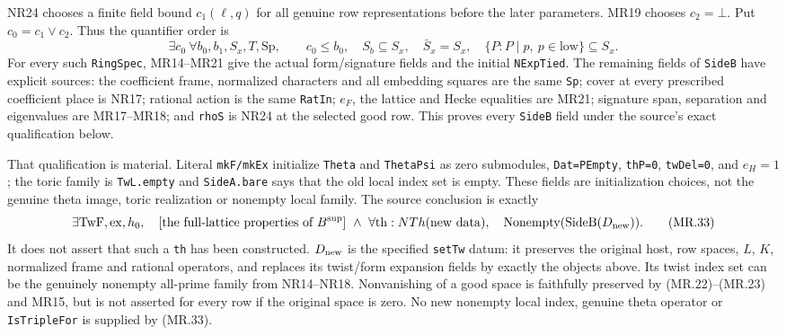 NR24 chooses a finite field bound $c_1(\ell,q)$ for all genuine
row representations before the later parameters. MR19 chooses
$c_2=\bot$. Put $c_0=c_1\vee c_2$. Thus the quantifier order is
\[
 \exists c_0\ \forall b_0,b_1,S_x,T,\mathrm{Sp},\qquad
 c_0\le b_0,\quad S_b\subseteq S_x,\quad
 \bar S_x=S_x,\quad
 \{P:P\mid p,\ p\in\mathrm{low}\}\subseteq S_x.    \tag{MR.32}
\]
For every such \texttt{RingSpec}, MR14--MR21 give the actual
form/signature fields and the initial \texttt{NExpTied}. The
remaining fields of \texttt{SideB} have explicit sources:
the coefficient frame, normalized characters and all embedding
squares are the same \texttt{Sp}; cover at every prescribed
coefficient place is NR17; rational action is the same
\texttt{RatIn}; $e_F$, the lattice and Hecke equalities are MR21;
signature span, separation and eigenvalues are MR17--MR18; and
\texttt{rhoS} is NR24 at the selected good row. This proves every
\texttt{SideB} field under the source's exact qualification below.

That qualification is material. Literal \texttt{mkF/mkEx} initialize
\texttt{Theta} and \texttt{ThetaPsi} as zero submodules,
\texttt{Dat=PEmpty}, \texttt{thP=0}, \texttt{twDel=0}, and
$e_H=1$; the toric family is \texttt{TwL.empty} and
\texttt{SideA.bare} says that the old local index set is empty.
These fields are initialization choices, not the genuine theta
image, toric realization or nonempty local family. The source
conclusion is exactly
\[
 \exists\mathrm{TwF},\mathrm{ex},h_0,\quad
  [\text{the full-lattice properties of }B^{\rm sup}]
  \ \land\ \forall\mathrm{th}:NTh(\mathrm{new\ data}),\quad
        \operatorname{Nonempty}(\mathrm{SideB}(D_{\rm new})).
                                                               \tag{MR.33}
\]
It does not assert that such a \texttt{th} has been constructed.
$D_{\rm new}$ is the specified \texttt{setTw} datum: it preserves
the original host, row spaces, $L$, $K$, normalized frame and
rational operators, and replaces its twist/form expansion fields
by exactly the objects above. Its twist index set can be the
genuinely nonempty all-prime family from NR14--NR18. Nonvanishing
of a good space is faithfully preserved by (MR.22)--(MR.23) and
MR15, but is not asserted for every row if the original space is
zero. No new nonempty local index, genuine theta operator or
\texttt{IsTripleFor} is supplied by (MR.33).


